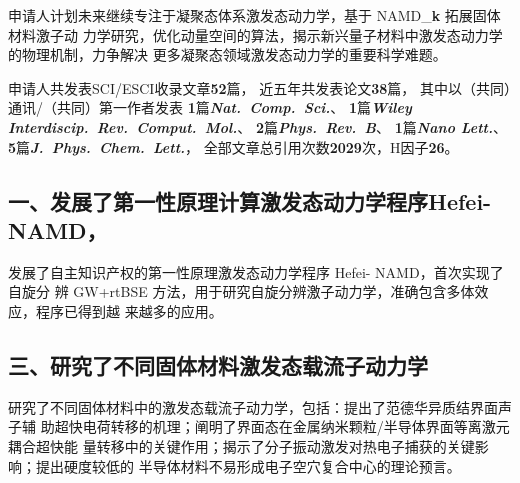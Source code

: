 \documentclass[12pt,UTF8,AutoFakeBold=3,a4paper]{article}
\newcommand{\namdk}{NAMD\_{\bf k}}
\newcommand{\hnamd}{Hefei-NAMD}
\begin{document}
申请人计划未来继续专注于凝聚态体系激发态动力学，基于 \namdk{} 拓展固体材料激子动
力学研究，优化动量空间的算法，揭示新兴量子材料中激发态动力学的物理机制，力争解决
更多凝聚态领域激发态动力学的重要科学难题。


申请人共发表SCI/ESCI收录文章{\large\bf{}52}篇，%
{
  近五年共发表论文{\large\bf{}38}篇，
  其中以（共同）通讯/（共同）第一作者发表
  {\bfseries\large{}1}篇{\bfseries\itshape Nat.\ Comp.\ Sci.}、
  {\bfseries\large{}1}篇{\bfseries\itshape Wiley Interdiscip.\ Rev.\ Comput.\ Mol.}、
  {\bfseries\large{}2}篇{\bfseries\itshape Phys.\ Rev.\ B}、
  {\bfseries\large{}1}篇{\bfseries\itshape Nano Lett.}、
  {\bfseries\large{}5}篇{\bfseries\itshape J.\ Phys.\ Chem.\ Lett.}，
  全部文章总引用次数{\large\bf{}2029}次，H因子{\large\bf{}26}。
}

\subsection*{一、发展了第一性原理计算激发态动力学程序\hnamd{}，}

\begin{center}
  \begin{InnovationBox}
    发展了自主知识产权的第一性原理激发态动力学程序 Hefei- NAMD，首次实现了自旋分
    辨 GW+rtBSE 方法，用于研究自旋分辨激子动力学，准确包含多体效应，程序已得到越
    来越多的应用。
  \end{InnovationBox}
\end{center}

\subsection*{三、研究了不同固体材料激发态载流子动力学}
\begin{center}
  \begin{InnovationBox}
    研究了不同固体材料中的激发态载流子动力学，包括：提出了范德华异质结界面声子辅
    助超快电荷转移的机理；阐明了界面态在金属纳米颗粒/半导体界面等离激元耦合超快能
    量转移中的关键作用；揭示了分子振动激发对热电子捕获的关键影响；提出硬度较低的
    半导体材料不易形成电子空穴复合中心的理论预言。
  \end{InnovationBox}
\end{center}
\end{document}
